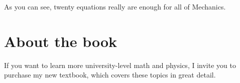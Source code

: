 \documentclass[letterpaper,9pt,journal]{IEEEtran}
\begin{document}
As you can see, twenty equations really are enough for all of Mechanics.




\vspace{-1mm}
\section*{About the book}

If you want to learn more university-level math and physics, 
I invite you to purchase my new textbook, which covers these topics in great detail.
        \begin{center}
            \setlength{\fboxsep}{0.45cm}
        \end{center}
\end{document}
